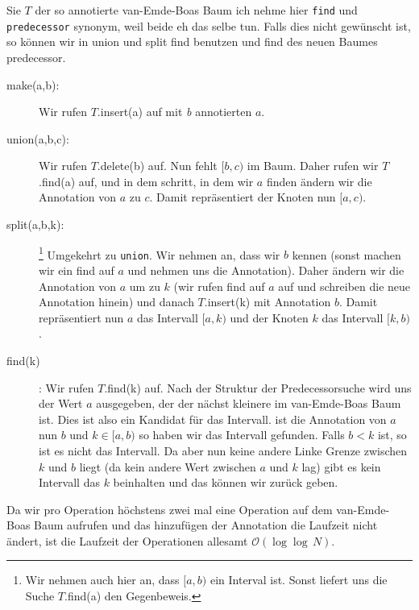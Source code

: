 \documentclass[11pt,a4paper,ngerman]{article}
\begin{document}
Sie $T$ der so annotierte van-Emde-Boas Baum ich nehme hier \lstinline|find| und \lstinline|predecessor| synonym, weil beide eh das selbe tun. Falls
dies nicht gewünscht ist, so können wir in union und split find benutzen und find des neuen Baumes predecessor.

\begin{description}
	\item[make(a,b):]  Wir rufen $T$.insert(a) auf mit \emph{b} annotierten $a$.
	\item[union(a,b,c):] Wir rufen $T$.delete(b) auf. Nun fehlt $[b,c)$ im Baum. Daher rufen wir $T$.find(a) auf, und
		in dem schritt, in dem wir $a$ finden ändern wir die Annotation von $a$ zu $c$. Damit repräsentiert der Knoten nun $[a,c)$.
	\item[split(a,b,k):]\footnote{Wir nehmen auch hier an, dass $[a,b)$ ein Interval ist. Sonst liefert uns die Suche $T$.find(a) den Gegenbeweis.}
		 Umgekehrt zu \lstinline|union|. Wir nehmen an, dass wir $b$ kennen (sonst machen wir ein find auf $a$ und nehmen
		uns die Annotation). Daher ändern wir die Annotation von $a$ um zu $k$ (wir rufen find auf $a$ auf und schreiben die neue Annotation 	
		hinein) und danach $T$.insert(k) mit Annotation $b$. Damit repräsentiert nun $a$ das Intervall $[a,k)$ und der Knoten $k$ das Intervall
		$[k,b)$. 
	\item[find(k)] : Wir rufen $T$.find(k) auf. Nach der Struktur der Predecessorsuche wird uns der Wert $a$ ausgegeben, der der nächst kleinere
		im van-Emde-Boas Baum ist. Dies ist also ein Kandidat für das Intervall. ist die Annotation von $a$ nun $b$ und $k \in [a,b)$ so
		haben wir das Intervall gefunden. Falls $b < k$ ist, so ist es nicht das Intervall. Da aber nun keine andere Linke Grenze zwischen $k$ und 		
		$b$ liegt (da kein andere Wert zwischen $a$ und $k$ lag) gibt es kein Intervall das $k$ beinhalten und das können wir zurück geben.
\end{description}

Da wir pro Operation höchstens zwei mal eine Operation auf dem van-Emde-Boas Baum aufrufen und das hinzufügen der Annotation die Laufzeit nicht ändert, ist die Laufzeit der Operationen allesamt $\mathcal{O}(\log \log \, N)$.

\label{LastPage}
\end{document}
